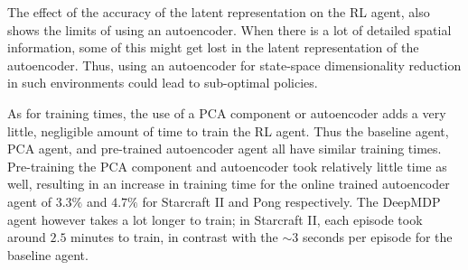The effect of the accuracy of the latent representation on the RL agent, also shows the limits of using an autoencoder. When there is a lot of detailed spatial information, some of this might get lost in the latent representation of the autoencoder. Thus, using an autoencoder for state-space dimensionality reduction in such environments could lead to sub-optimal policies.

As for training times, the use of a PCA component or autoencoder adds a very little, negligible amount of time to train the RL agent. Thus the baseline agent, PCA agent, and pre-trained autoencoder agent all have similar training times. Pre-training the PCA component and autoencoder took relatively little time as well, resulting in an increase in training time for the online trained autoencoder agent of $3.3\%$ and $4.7\%$ for Starcraft II and Pong respectively. The DeepMDP agent however takes a lot longer to train; in Starcraft II, each episode took around $2.5$ minutes to train, in contrast with the $\sim3$ seconds per episode for the baseline agent.